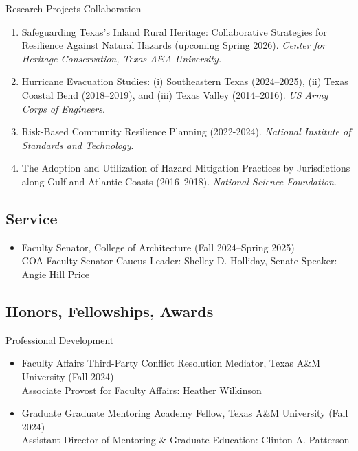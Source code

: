 \documentclass[11pt,oneside]{article}
\begin{document}
\vspace{1pt}

{Research Projects Collaboration}
\begin{enumerate}[leftmargin=20pt]
\item Safeguarding Texas's Inland Rural Heritage: Collaborative Strategies for Resilience Against Natural Hazards (upcoming Spring 2026). \emph{Center for Heritage Conservation, Texas A\&A University.}
\item Hurricane Evacuation Studies: (i) Southeastern Texas (2024--2025), (ii) Texas Coastal Bend (2018--2019), and (iii) Texas Valley (2014--2016). \emph{US Army Corps of Engineers}.
\item Risk-Based Community Resilience Planning (2022-2024). \emph{National Institute of Standards and Technology}.
\item The Adoption and Utilization of Hazard Mitigation Practices by Jurisdictions along Gulf and Atlantic Coasts (2016--2018). \emph{National Science Foundation}.
\end{enumerate}

\subsection*{Service}
\begin{itemize}[leftmargin=20pt]
\item Faculty Senator, College of Architecture (Fall 2024--Spring 2025)\\
      COA Faculty Senator Caucus Leader: Shelley D. Holliday, Senate Speaker: Angie Hill Price
\end{itemize}

\subsection*{Honors, Fellowships, Awards}

{Professional Development}
\begin{itemize}[leftmargin=20pt]
\item Faculty Affairs Third-Party Conflict Resolution Mediator, Texas A\&M University (Fall 2024)\\
      Associate Provost for Faculty Affairs: Heather Wilkinson
\item Graduate Graduate Mentoring Academy Fellow, Texas A\&M University (Fall 2024)\\
      Assistant Director of Mentoring \& Graduate Education: Clinton A. Patterson
\end{itemize}
\end{document}
